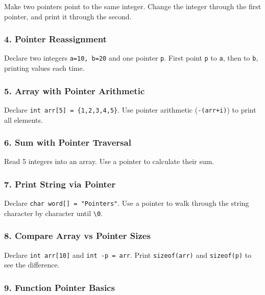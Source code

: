 \documentclass[
  letterpaper,
  DIV=11,
  numbers=noendperiod]{scrreprt}
\begin{document}
Make two pointers point to the same integer. Change the integer through
the first pointer, and print it through the second.

\subsubsection{4. Pointer Reassignment}\label{pointer-reassignment}

Declare two integers \texttt{a=10,\ b=20} and one pointer \texttt{p}.
First point \texttt{p} to \texttt{a}, then to \texttt{b}, printing
values each time.

\subsubsection{5. Array with Pointer
Arithmetic}\label{array-with-pointer-arithmetic}

Declare \texttt{int\ arr{[}5{]}\ =\ \{1,2,3,4,5\}}. Use pointer
arithmetic (\texttt{-(arr+i)}) to print all elements.

\subsubsection{6. Sum with Pointer
Traversal}\label{sum-with-pointer-traversal}

Read 5 integers into an array. Use a pointer to calculate their sum.

\subsubsection{7. Print String via
Pointer}\label{print-string-via-pointer}

Declare \texttt{char\ word{[}{]}\ =\ "Pointers"}. Use a pointer to walk
through the string character by character until
\texttt{\textquotesingle{}\textbackslash{}0\textquotesingle{}}.

\subsubsection{8. Compare Array vs Pointer
Sizes}\label{compare-array-vs-pointer-sizes}

Declare \texttt{int\ arr{[}10{]}} and \texttt{int\ -p\ =\ arr}. Print
\texttt{sizeof(arr)} and \texttt{sizeof(p)} to see the difference.

\subsubsection{9. Function Pointer
Basics}\label{function-pointer-basics}
\end{document}
